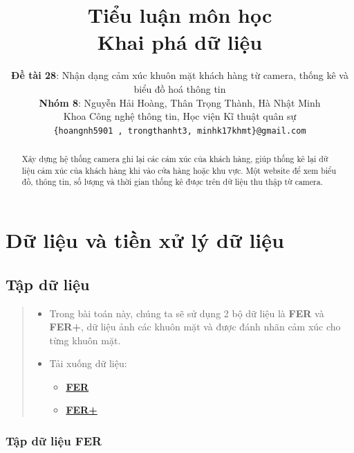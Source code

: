 \documentclass{article}
\title{
  Tiểu luận môn học\\
  \textbf{Khai phá dữ liệu}\\
  }
\author{
   \textbf{Đề tài 28}: Nhận dạng cảm xúc khuôn mặt khách hàng từ camera, thống kê và biểu đồ hoá thông tin\\
   \textbf{Nhóm 8}: Nguyễn Hải Hoàng, Thân Trọng Thành, Hà Nhật Minh\\

   \normalsize{Khoa Công nghệ thông tin, Học viện Kĩ thuật quân sự}\\
   
   \texttt{\{hoangnh5901 , trongthanht3, minhk17khmt\}@gmail.com}
   }
\begin{document}
\maketitle

\begin{abstract}
Xây dựng hệ thống camera ghi lại các cám xúc của khách hàng, giúp thống kê lại dữ liệu cảm xúc của khách hàng khi vào cửa hàng hoặc khu vực. Một website để xem biểu đồ, thông tin, số lượng và thời gian thống kê được trên dữ liệu thu thập từ camera.
\end{abstract}

\section{Dữ liệu và tiền xử lý dữ liệu}
\subsection{Tập dữ liệu}
\begin{quote}
   \begin{itemize}
      \item Trong bài toán này, chúng ta sẽ sử dụng 2 bộ dữ liệu là \textbf{FER} và \textbf{FER+}, dữ liệu ảnh các khuôn mặt và được đánh nhãn cảm xúc cho từng khuôn mặt.
      \item Tải xuống dữ liệu:
      \begin{itemize}
         \item \href{https://www.kaggle.com/c/challenges-in-representation-learning-facial-expression-recognition-challenge/data}{\textbf{FER}}
         \item \href{https://github.com/microsoft/FERPlus/tree/master/data}{\textbf{FER+}}
      \end{itemize}
   \end{itemize}
\end{quote}
\subsubsection{Tập dữ liệu FER}
\end{document}
